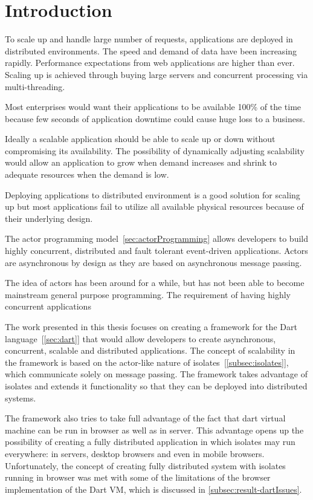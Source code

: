 \chapter{Introduction}\label{chapter:introduction}

  To scale up and handle large number of requests, applications are deployed in distributed environments. The speed and demand of data have been increasing rapidly. Performance expectations from web applications are higher than ever. Scaling up is achieved through buying large servers and concurrent processing via multi-threading.

  Most enterprises would want their applications to be available 100\% of the time because few seconds of application downtime could cause huge loss to a business.

  Ideally a scalable application should be able to scale up or down without compromising its availability. The possibility of dynamically adjusting scalability would allow an application to grow when demand increases and shrink to adequate resources when the demand is low.

  Deploying applications to distributed environment is a good solution for scaling up but most applications fail to utilize all available physical resources because of their underlying design.

  The actor programming model~\autoref{sec:actorProgramming} allows developers to build highly concurrent, distributed and fault tolerant event-driven applications. Actors are asynchronous by design as they are based on asynchronous message passing.

   The idea of actors has been around for a while, but has not been able to become mainstream general purpose programming. The requirement of having highly concurrent applications

  The work presented in this thesis focuses on creating a framework for the Dart language~[\autoref{sec:dart}] that would allow developers to create asynchronous, concurrent, scalable and distributed applications. The concept of scalability in the framework is based on the actor-like nature of isolates~[\autoref{subsec:isolates}], which communicate solely on message passing. The framework takes advantage of isolates and extends it functionality so that they can be deployed into distributed systems.

  The framework also tries to take full advantage of the fact that dart virtual machine can be run in browser as well as in server.  This advantage opens up the possibility of creating a fully distributed application in which isolates may run everywhere: in servers, desktop browsers and even in mobile browsers. Unfortunately, the concept of creating fully distributed system with isolates running in browser was met with some of the limitations of the browser implementation of the Dart VM, which is discussed in \autoref{subsec:result-dartIssues}.

